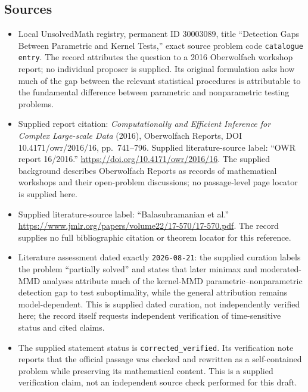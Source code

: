 \documentclass[11pt]{article}
\begin{document}
\subsection{Sources}
\begin{itemize}
\item Local UnsolvedMath registry, permanent ID \(30003089\), title ``Detection Gaps Between Parametric and Kernel Tests,'' exact source problem code \texttt{catalogue entry}. The record attributes the question to a 2016 Oberwolfach workshop report; no individual proposer is supplied. Its original formulation asks how much of the gap between the relevant statistical procedures is attributable to the fundamental difference between parametric and nonparametric testing problems.
\item Supplied report citation: \emph{Computationally and Efficient Inference for Complex Large-scale Data} (2016), Oberwolfach Reports, DOI 10.4171/owr/2016/16, pp.\ 741--796. Supplied literature-source label: ``OWR report 16/2016.'' \url{https://doi.org/10.4171/owr/2016/16}. The supplied background describes Oberwolfach Reports as records of mathematical workshops and their open-problem discussions; no passage-level page locator is supplied here.
\item Supplied literature-source label: ``Balasubramanian et al.'' \url{https://www.jmlr.org/papers/volume22/17-570/17-570.pdf}. The record supplies no full bibliographic citation or theorem locator for this reference.
\item Literature assessment dated exactly \texttt{2026-08-21}: the supplied curation labels the problem ``partially solved'' and states that later minimax and moderated-MMD analyses attribute much of the kernel-MMD parametric--nonparametric detection gap to test suboptimality, while the general attribution remains model-dependent. This is supplied dated curation, not independently verified here; the record itself requests independent verification of time-sensitive status and cited claims.
\item The supplied statement status is \texttt{corrected\_verified}. Its verification note reports that the official passage was checked and rewritten as a self-contained problem while preserving its mathematical content. This is a supplied verification claim, not an independent source check performed for this draft.
\end{itemize}
\end{document}
